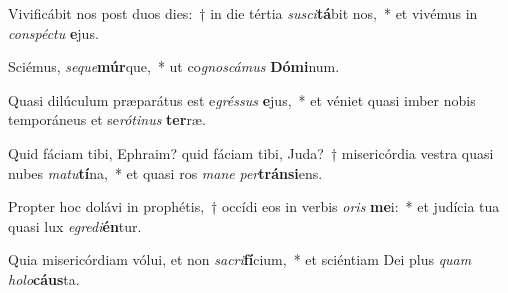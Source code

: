 \item Vivificábit nos post duos dies:~† in die tértia \textit{su}\textit{sci}\textbf{tá}bit nos,~* et vivémus in \textit{con}\textit{spéc}\textit{tu} \textbf{e}jus.
\item Sciémus, \textit{se}\textit{que}\textbf{múr}que,~* ut co\textit{gnos}\textit{cá}\textit{mus} \textbf{Dó}\textbf{mi}num.
\item Quasi dilúculum præparátus est e\textit{grés}\textit{sus} \textbf{e}jus,~* et véniet quasi imber nobis temporáneus et se\textit{ró}\textit{ti}\textit{nus} \textbf{ter}ræ.
\item Quid fáciam tibi, Ephraim? quid fáciam tibi, Juda?~† misericórdia vestra quasi nubes \textit{ma}\textit{tu}\textbf{tí}na,~* et quasi ros \textit{ma}\textit{ne} \textit{per}\textbf{tráns}\textbf{i}ens.
\item Propter hoc dolávi in prophétis,~† occídi eos in verbis \textit{o}\textit{ris} \textbf{me}i:~* et judícia tua quasi lux \textit{e}\textit{gre}\textit{di}\textbf{én}tur.
\item Quia misericórdiam vólui, et non \textit{sa}\textit{cri}\textbf{fí}cium,~* et sciéntiam Dei plus \textit{quam} \textit{ho}\textit{lo}\textbf{cáus}ta.
